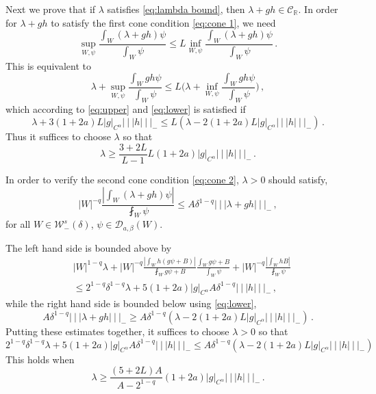 \documentclass{amsart}
\numberwithin{equation}{section}
\newcommand\cC{{\mathcal C}}
\newcommand\cD{{\mathcal D}}
\newcommand\cW{{\mathcal W}}
\newcommand\bR{{\mathbb R}}
\newcommand{\tri}{{|\:\!\!|\:\!\!|}}
\begin{document}
Next we prove that if $\lambda$ satisfies \eqref{eq:lambda bound}, then $\lambda + gh \in \cC_\bR$. 
In order for $\lambda + gh$ to satisfy the first cone condition \eqref{eq:cone 1}, we need
\[
\sup_{W, \psi} \frac{\int_W (\lambda + gh) \psi}{\int_W \psi }\le L \inf_{W, \psi} \frac{\int_W (\lambda + gh) \psi}{\int_W \psi} \, .
\]
This is equivalent to
\[
\lambda + \sup_{W, \psi} \frac{ \int_W gh \psi}{\int_W \psi} \le L \Big(\lambda + \inf_{W, \psi} \frac{\int_W gh \psi}{\int_W \psi} \Big) \, ,
\]
which according to \eqref{eq:upper} and \eqref{eq:lower} is satisfied if
\[
\lambda + 3(1+2a) L |g|_{C^\alpha} \tri h \tri_- \le L (\lambda -  2(1+2a) L |g|_{C^\alpha} \tri h \tri_- )\, .
\]
Thus it suffices to choose $\lambda$ so that
\begin{equation}
\label{eq:first norm condition}
\lambda \ge \frac{3+2L }{L-1} L (1+2a) |g|_{C^\alpha} \tri h \tri_-  \, .
\end{equation}

In order to verify the second cone condition \eqref{eq:cone 2}, $\lambda>0$ should satisfy,
\[
|W|^{-q} \frac{ | \int_W (\lambda + gh) \psi |}{\fint_W \psi} \le A \delta^{1-q} \tri \lambda + gh \tri_- \, ,
\]
for all $W \in \cW^s_-(\delta)$, $\psi \in \cD_{a,\beta}(W)$.

The left hand side is bounded above by 
\begin{equation}
\label{eq:useful g}
\begin{split}
& |W|^{1-q} \lambda + |W|^{-q}\frac{|\int_W h (g\psi + B) |}{\fint_W g \psi + B} \frac{\int_W g\psi + B}{\int_W \psi}
+  |W|^{-q} \frac{|\int_W h B |}{\fint_W \psi}  \\
& \le 2^{1-q} \delta^{1-q} \lambda + 5(1+2a)|g|_{C^\alpha} A \delta^{1-q} \tri h \tri_- \, ,
\end{split}
\end{equation}
while the right hand side is bounded below using \eqref{eq:lower},
\[
A \delta^{1-q} \tri \lambda + gh \tri_- \ge A \delta^{1-q} (\lambda - 2(1+2a) L |g|_{C^\alpha} \tri h \tri_- ) \, .
\]
Putting these estimates together, it suffices to choose $\lambda>0$ so that
\[
2^{1-q} \delta^{1-q} \lambda + 5(1+2a) |g|_{C^\alpha} A \delta^{1-q} \tri h \tri_- \le A \delta^{1-q} (\lambda -  2(1+2a) L |g|_{C^\alpha} \tri h \tri_- )
\]
This holds when
\begin{equation}
\label{eq:second norm condition}
\lambda \ge \frac{ (5+2L) A   }{A - 2^{1-q}}  (1+2a) |g|_{C^\alpha} \tri h \tri_-  \, .
\end{equation}
\end{document}
